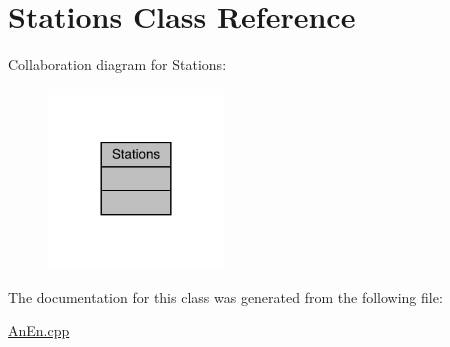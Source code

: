 \hypertarget{class_stations}{}\section{Stations Class Reference}
\label{class_stations}


Collaboration diagram for Stations\+:
\nopagebreak
\begin{figure}[H]
\begin{center}
\leavevmode
\includegraphics[width=132pt]{class_stations__coll__graph}
\end{center}
\end{figure}


The documentation for this class was generated from the following file\+:\begin{DoxyCompactItemize}
\item 
\mbox{\hyperlink{_an_en_8cpp}{An\+En.\+cpp}}\end{DoxyCompactItemize}
